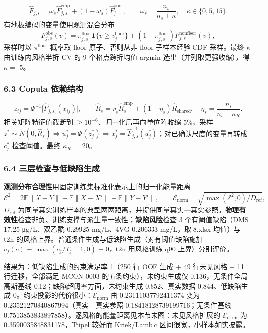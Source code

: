 \documentclass[
  11pt,
]{article}
\begin{document}
\[
\widehat F_{j,s}=\omega_s\widehat F^{\mathrm{emp}}_{j,s}+(1-\omega_s)\widehat F^{\mathrm{pool}}_j,\qquad \omega_s=\frac{n_s}{n_s+\kappa},\quad \kappa\in\{0,5,15\}.
\] 有地板编码的变量使用观测混合分布 \[
F^{\mathrm{obs}}_{j,s}(v)=\pi^{\mathrm{floor}}_{j,s}\mathbf 1\{v\ge v_j^{\mathrm{floor}}\}+(1-\pi^{\mathrm{floor}}_{j,s})F^{\mathrm{nonfloor}}_{j,s}(v),
\] 采样时以 \(\pi^{\mathrm{floor}}\) 概率取 floor 原子、否则从非 floor
子样本经验 CDF 采样。最终 \(\kappa\) 由训练内风格半折 CV 的 9
个格点跨折均值 argmin 选出（并列取更强收缩），得 \(\kappa=\) 5。

\subsubsection{6.3 Copula
依赖结构}\label{copula-ux4f9dux8d56ux7ed3ux6784}

\[
z_{ij}=\Phi^{-1}\big[\widehat F_{j,s_i}(x_{ij})\big],\qquad \widehat R_s=\eta_s\widehat R_s^{\mathrm{emp}}+(1-\eta_s)\widehat R_{\mathrm{shared}},\quad \eta_s=\frac{n_s}{n_s+\kappa_R}.
\] 相关矩阵特征值截断到 \(\ge10^{-6}\)、归一化后再向单位阵收缩 5\%，采样
\(z^*\sim N(0,\widehat R_s)\Rightarrow u_j^*=\Phi(z_j^*)\Rightarrow x_j^*=\widehat F_{j,s}^{-1}(u_j^*)\)；对已确认尺度的变量再转成
\(c_j^*\) 检查阈值。最终 \(\kappa_R=\) 20。

\subsubsection{6.4
三层检查与低缺陷生成}\label{ux4e09ux5c42ux68c0ux67e5ux4e0eux4f4eux7f3aux9677ux751fux6210}

\textbf{观测分布合理性}用固定训练集标准化表示上的归一化能量距离 \[
\mathcal E^2=2\mathbb E\|X-Y\|-\mathbb E\|X-X'\|-\mathbb E\|Y-Y'\|,\qquad \mathcal E_{\mathrm{norm}}=\sqrt{\max(\mathcal E^2,0)/D_{\mathrm{ref}}},
\] \(D_{\mathrm{ref}}\)
为同量真实训练样本的典型两两距离，并提供同量真实---真实参照。\textbf{物理有效性}检查非负、训练支撑与派生量一致性；\textbf{缺陷风险}检查
3 个有阈值缺陷（DMS 17.25 μg/L、双乙酰 0.29925 mg/L、4VG 0.206333
mg/L，取 8.xlsx 均值）与 t2n
的风格上界。普通条件生成与低缺陷生成（对有阈值缺陷施加
\(e_j(c)=\max(c_j/T_j-1,0)=0\)，t2n 用风格训练 q90 上界）分别评价。

结果为：低缺陷生成的约束满足率 1（250 行 OOF 生成 + 49 行未见风格 + 11
行迁移，全部满足 MCON-0003 的五条约束），未约束生成仅
0.136，无条件全局高斯基线 0.12；缺陷超阈率方面，未约束生成
0.852、真实数据 0.844、低缺陷生成
0。约束投影的代价很小：\(\mathcal E_{\mathrm{norm}}\) 由
0.23111037792411374 变为 0.23521270840867994（真实---真实参照
0.18418128739199716；无条件基线
0.7513853833897858）。逐风格的能量距离见本节末图：未见风格扩展的
\(\mathcal E_{\mathrm{norm}}\) 为 0.3590035848831178，Tripel 较好而
Kriek/Lambic 区间很宽，小样本如实披露。
\end{document}
